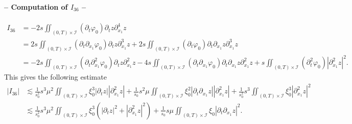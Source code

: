 \documentclass[a4paper, 12pt]{article}
\theoremstyle{plain}
\theoremstyle{definition}
\numberwithin{theorem}{section}
\numberwithin{equation}{section}
\begin{document}
{\paragraph{-- Computation of $I_{36}$ --}
\begin{align*}
I_{36}&=-2s\iint_{(0,T)\times\mathcal{I}} (\partial_t\varphi_0)\partial_tz \partial^4_{x_1}z\\
&=2s\iint_{(0,T)\times\mathcal{I}} (\partial_t\partial_{x_1}\varphi_0) \partial_tz \partial^3_{x_1}z+2s\iint_{(0,T)\times\mathcal{I}} (\partial_t\varphi_0) \partial_t\partial_{x_1}z \partial^3_{x_1}z\\
&=-2s\iint_{(0,T)\times\mathcal{I}}(\partial_t\partial^2_{x_1}\varphi_0) \partial_tz \partial^2_{x_1}z-4s\iint_{(0,T)\times\mathcal{I}}(\partial_t\partial_{x_1}\varphi_0) \partial_t\partial_{x_1}z \partial^2_{x_1}z+s\iint_{(0,T)\times\mathcal{I}} (\partial^2_t\varphi_0) |\partial^2_{x_1}z|^2.
\end{align*}
This gives the following estimate
\begin{align*}
|I_{36}|&\lesssim \frac{1}{s_0^2}s^3 \mu^2 \iint_{(0,T)\times\mathcal{I}}\xi_0^{3}|\partial_tz||\partial^2_{x_1}z|+\frac{1}{s_0}s^2 \mu \iint_{(0,T)\times\mathcal{I}}\xi_0^{2}|\partial_t\partial_{x_1}z||\partial^2_{x_1}z|+\frac{1}{s_0^2}s^3\iint_{(0,T)\times\mathcal{I}}\xi_0^{3}|\partial^2_{x_1}z|^2\\
&\lesssim \frac{1}{s_0^2}s^3 \mu^2 \iint_{(0,T)\times\mathcal{I}}\xi_0^{3}(|\partial_tz|^2+|\partial^2_{x_1}z|^2)+\frac{1}{s_0}s\mu \iint_{(0,T)\times\mathcal{I}}\xi_0|\partial_t\partial_{x_1}z|^2.
\end{align*}
}
\end{document}
